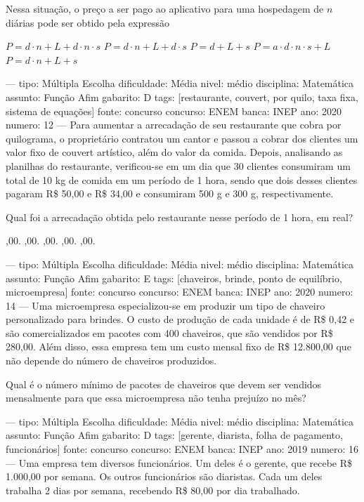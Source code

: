 Nessa situação, o preço a ser pago ao aplicativo para uma hospedagem de \( n \) diárias pode ser obtido pela expressão
\begin{choices}
\correctchoice \( P = d \cdot n + L + d \cdot n \cdot s \)
\choice \( P = d \cdot n + L + d \cdot s \)
\choice \( P = d + L + s \)
\choice \( P = a \cdot d \cdot n \cdot s + L \)
\choice \( P = d \cdot n + L + s \)
\end{choices}

---
tipo: Múltipla Escolha
dificuldade: Média
nivel: médio
disciplina: Matemática
assunto: Função Afim
gabarito: D
tags: [restaurante, couvert, por quilo, taxa fixa, sistema de equações]
fonte: concurso
concurso: ENEM
banca: INEP
ano: 2020
numero: 12
---
\question
Para aumentar a arrecadação de seu restaurante que cobra por quilograma, o proprietário contratou um cantor e passou a cobrar dos clientes um valor fixo de couvert artístico, além do valor da comida. Depois, analisando as planilhas do restaurante, verificou-se em um dia que 30 clientes consumiram um total de 10 kg de comida em um período de 1 hora, sendo que dois desses clientes pagaram R\$ 50,00 e R\$ 34,00 e consumiram 500 g e 300 g, respectivamente.

Qual foi a arrecadação obtida pelo restaurante nesse período de 1 hora, em real?
\begin{oneparchoices}
,00.
,00.
,00.
,00.
,00.
\end{oneparchoices}

---
tipo: Múltipla Escolha
dificuldade: Média
nivel: médio
disciplina: Matemática
assunto: Função Afim
gabarito: E
tags: [chaveiros, brinde, ponto de equilíbrio, microempresa]
fonte: concurso
concurso: ENEM
banca: INEP
ano: 2020
numero: 14
---
\question
Uma microempresa especializou-se em produzir um tipo de chaveiro personalizado para brindes. O custo de produção de cada unidade é de R\$ 0,42 e são comercializados em pacotes com 400 chaveiros, que são vendidos por R\$ 280,00. Além disso, essa empresa tem um custo mensal fixo de R\$ 12.800,00 que não depende do número de chaveiros produzidos.

Qual é o número mínimo de pacotes de chaveiros que devem ser vendidos mensalmente para que essa microempresa não tenha prejuízo no mês?
\begin{oneparchoices}
\end{oneparchoices}

---
tipo: Múltipla Escolha
dificuldade: Média
nivel: médio
disciplina: Matemática
assunto: Função Afim
gabarito: D
tags: [gerente, diarista, folha de pagamento, funcionários]
fonte: concurso
concurso: ENEM
banca: INEP
ano: 2019
numero: 16
---
\question
Uma empresa tem diversos funcionários. Um deles é o gerente, que recebe R\$ 1.000,00 por semana. Os outros funcionários são diaristas. Cada um deles trabalha 2 dias por semana, recebendo R\$ 80,00 por dia trabalhado.

